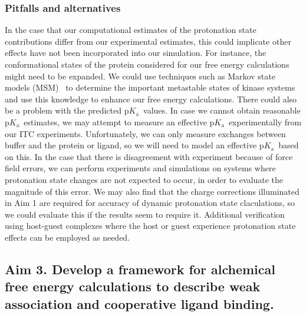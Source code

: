 \documentclass[10pt,final]{article}
\newcommand{\pKa}{p$K_\mathrm{a}$\ }
\begin{document}
\subsubsection*{Pitfalls and alternatives}
In the case that our computational estimates of the protonation state contributions differ from our experimental estimates, this could implicate other effects have not been incorporated into our simulation. 
%
For instance, the conformational states of the protein considered for our free energy calculations might need to be expanded.
%
We could use techniques such as Markov state models (MSM)~\autocite{Prinz2011a} to determine the important metastable states of kinase systems and use this knowledge to enhance our free energy calculations.
%
There could also be a problem with the predicted \pKa values.
%
In case we cannot obtain reasonable \pKa estimates, we may attempt to measure an effective \pKa experimentally from our ITC experiments.
%
Unfortunately, we can only measure exchanges between buffer and the protein or ligand, so we will need to model an effective \pKa based on this.
%
In the case that there is disagreement with experiment because of force field errors, we can perform experiments and simulations on systems where protonation state changes are not expected to occur, in order to evaluate the magnitude of this error.
%
We may also find that the charge corrections illuminated in Aim 1 are required for accuracy of dynamic protonation state claculations, so we could evaluate this if the results seem to require it.
%
Additional verification using host-guest complexes where the host or guest experience protonation state effects can be employed as needed.

\subsection*{Aim 3. Develop a framework for alchemical free energy calculations to describe weak association and cooperative ligand binding.}
\end{document}

